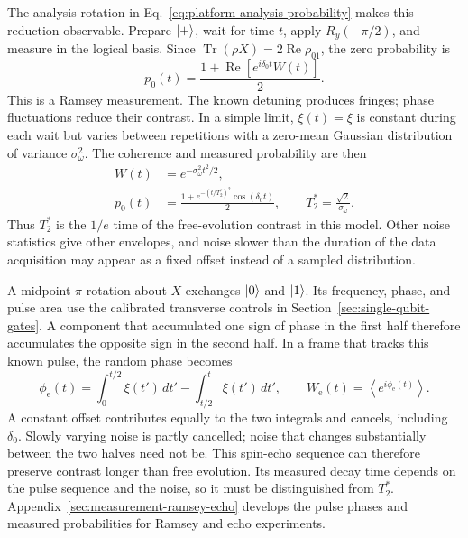 The analysis rotation in
Eq.~\eqref{eq:platform-analysis-probability} makes this reduction
observable. Prepare $\lvert +\rangle$, wait for time $t$, apply $R_y(-\pi/2)$,
and measure in the logical basis. Since
$\operatorname{Tr}(\rho X)=2\operatorname{Re}\rho_{01}$, the zero
probability is
\begin{equation}
 p_0(t)=\frac{1+\operatorname{Re}[e^{i\delta_0t}W(t)]}{2}.
 \label{eq:platform-ramsey-coherence}
\end{equation}
This is a Ramsey measurement. The known detuning produces fringes;
phase fluctuations reduce their contrast. In a simple limit,
$\xi(t)=\xi$ is constant during each wait but varies between
repetitions with a zero-mean Gaussian distribution of variance
$\sigma_\omega^2$. The coherence and measured probability are then
\begin{equation}
 \begin{aligned}
 W(t)&=e^{-\sigma_\omega^2t^2/2},\\
 p_0(t)&=\frac{1+e^{-(t/T_2^*)^2}\cos(\delta_0t)}2,
 \qquad T_2^*=\frac{\sqrt2}{\sigma_\omega}.
 \end{aligned}
 \label{eq:platform-gaussian-coherence}
\end{equation}
Thus $T_2^*$ is the $1/e$ time of the free-evolution contrast in
this model. Other noise statistics give other envelopes, and noise
slower than the duration of the data acquisition may appear as a
fixed offset instead of a sampled distribution.

A midpoint $\pi$ rotation about $X$ exchanges $\lvert 0\rangle$ and $\lvert 1\rangle$.
Its frequency, phase, and pulse area use the calibrated transverse
controls in Section~\ref{sec:single-qubit-gates}.
A component that accumulated one sign of phase in the first half
therefore accumulates the opposite sign in the second half.
In a frame that tracks this known pulse, the random phase becomes
\begin{equation}
 \phi_{\mathrm e}(t)
   =\int_0^{t/2}\xi(t')\,dt'
       -\int_{t/2}^{t}\xi(t')\,dt',
 \qquad W_{\mathrm e}(t)=\left\langle e^{i\phi_{\mathrm e}(t)}\right\rangle.
 \label{eq:platform-echo-coherence}
\end{equation}
A constant offset contributes equally to the two integrals and
cancels, including $\delta_0$. Slowly varying noise is partly
cancelled; noise that changes substantially between the two halves
need not be. This spin-echo sequence can therefore preserve contrast
longer than free evolution. Its measured decay time depends on the
pulse sequence and the noise, so it must be distinguished from
$T_2^*$. Appendix~\ref{sec:measurement-ramsey-echo} develops the pulse
phases and measured probabilities for Ramsey and echo experiments.

